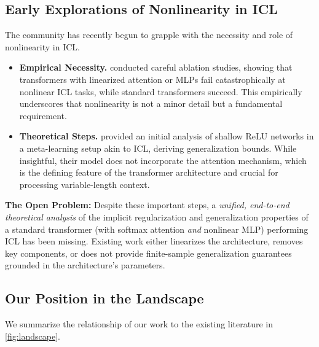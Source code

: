 \subsection{Early Explorations of Nonlinearity in ICL}
\label{subsec:nonlinear-explore}

The community has recently begun to grapple with the necessity and role of nonlinearity in ICL.

\begin{itemize}
	\item \textbf{Empirical Necessity.} \citet{sohn2024understanding} conducted careful ablation studies, showing that transformers with linearized attention or MLPs fail catastrophically at nonlinear ICL tasks, while standard transformers succeed. This empirically underscores that nonlinearity is not a minor detail but a fundamental requirement.
	\item \textbf{Theoretical Steps.} \citet{liu2023theoretical} provided an initial analysis of shallow ReLU networks in a meta-learning setup akin to ICL, deriving generalization bounds. While insightful, their model does not incorporate the attention mechanism, which is the defining feature of the transformer architecture and crucial for processing variable-length context.
\end{itemize}

\textbf{The Open Problem:} Despite these important steps, a \textit{unified, end-to-end theoretical analysis} of the implicit regularization and generalization properties of a standard transformer (with softmax attention \textit{and} nonlinear MLP) performing ICL has been missing. Existing work either linearizes the architecture, removes key components, or does not provide finite-sample generalization guarantees grounded in the architecture's parameters.

\subsection{Our Position in the Landscape}

We summarize the relationship of our work to the existing literature in \cref{fig:landscape}.

